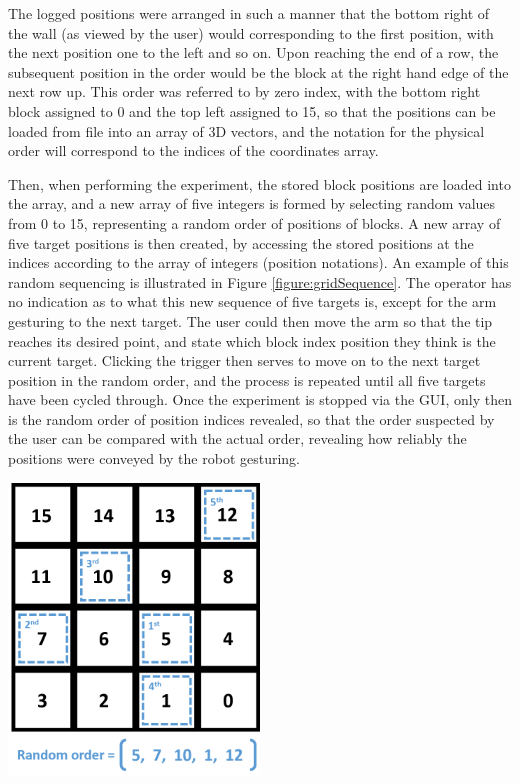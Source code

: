 \documentclass[11pt]{article}
\begin{document}
The logged positions were arranged in such a manner that the bottom right of the wall (as viewed by the user) would corresponding to the first position, with the next position one to the left and so on. Upon reaching the end of a row, the subsequent position in the order would be the block at the right hand edge of the next row up. This order was referred to by zero index, with the bottom right block assigned to 0 and the top left assigned to 15, so that the positions can be loaded from file into an array of 3D vectors, and the notation for the physical order will correspond to the indices of the coordinates array. 

Then, when performing the experiment, the stored block positions are loaded into the array, and a new array of five integers is formed by selecting random values from 0 to 15, representing a random order of positions of blocks. A new array of five target positions is then created, by accessing the stored positions at the indices according to the array of integers (position notations). An example of this random sequencing is illustrated in Figure \ref{figure:gridSequence}. The operator has no indication as to what this new sequence of five targets is, except for the arm gesturing to the next target. The user could then move the arm so that the tip reaches its desired point, and state which block index position they think is the current target. Clicking the trigger then serves to move on to the next target position in the random order, and the process is repeated until all five targets have been cycled through. Once the experiment is stopped via the GUI, only then is the random order of position indices revealed, so that the order suspected by the user can be compared with the actual order, revealing how reliably the positions were conveyed by the robot gesturing.

\begin{center}
\includegraphics[width=0.5\textwidth]{images/gridSequence.png}
\label{figure:gridSequence}
\end{center}
\end{document}
